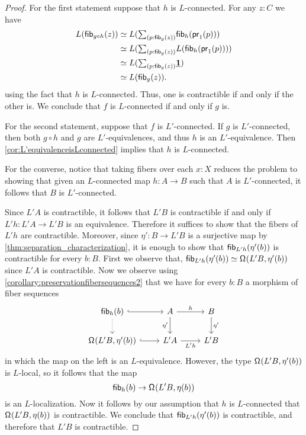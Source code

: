 \begin{proof}
For the first statement suppose that $h$ is $L$-connected.
  For any $z:C$ we have
  \begin{align*}
    L(\fib{g\circ h}{z})
    & \eqvsym
      L(\sm{p:\fib{g}{z}}\fib{h}{\proj1(p)}) \\
    & \eqvsym
      L(\sm{p:\fib{g}{z}}L(\fib{h}{\proj1(p)})) \\
    & \eqvsym
      L(\sm{p:\fib{g}{z}}\unit) \\
    & \eqvsym
      L(\fib{g}{z}).
  \end{align*}
  using the fact that $h$ is $L$-connected.
  Thus, one is contractible if and only if the other is. We conclude that $f$ is $L$-connected if and only if $g$ is.

For the second statement, suppose that $f$ is $L'$-connected.
    If $g$ is $L'$-connected, then both $g\circ h$ and $g$ are $L'$-equivalences,
    and thus $h$ is an $L'$-equivalence. Then \cref{cor:L'equivalenceisLconnected}
    implies that $h$ is $L$-connected.

    For the converse, notice that taking fibers over each $x:X$ reduces the problem
    to showing that given an $L$-connected map $h : A \to B$
    such that $A$ is $L'$-connected, it follows that $B$ is $L'$-connected.

    Since $L'A$ is contractible, it follows that $L'B$ is contractible if and only if $L'h:L'A\to L'B$ is an equivalence.
    Therefore it suffices to show that the fibers of $L'h$ are contractible. Moreover, since $\eta':B\to L'B$ is a surjective map by \cref{thm:separation_characterization}, it is enough to show that $\mathsf{fib}_{L'h}(\eta'(b))$ is contractible for every $b:B$.
First we observe that, $\eqv{\fib{L'h}{\eta'(b)}}{\loopspace{L'B,\eta'(b)}}$ since $L'A$ is contractible. 
    Now we observe using \cref{corollary:preservationfibersequences2} that we have for every $b:B$ a morphism of fiber sequences
\begin{equation*}
\begin{tikzcd}
\fib{h}{b} \arrow[r,hookrightarrow] \arrow[d,densely dotted] & A \arrow[d,swap,"\eta'"] \arrow[r,"h"] & B \arrow[d,"\eta'"] \\
\loopspace{L'B,\eta'(b)} \arrow[r,hookrightarrow] & L'A \arrow[r,swap,"L'h"] & L'B
\end{tikzcd}
\end{equation*}
in which the map on the left is an $L$-equivalence. However, the type $\mathsf{\Omega}^{}(L'B,\eta'(b))$ is $L$-local, so it follows that the map
\begin{equation*}
\mathsf{fib}_{h}(b)\to \mathsf{\Omega}^{}(L'B,\eta(b))
\end{equation*}
is an $L$-localization. Now it follows by our assumption that $h$ is $L$-connected that $\mathsf{\Omega}^{}(L'B,\eta(b))$ is contractible. We conclude that $\mathsf{fib}_{L'h}(\eta'(b))$ is contractible, and therefore that $L'B$ is contractible.
\end{proof}

